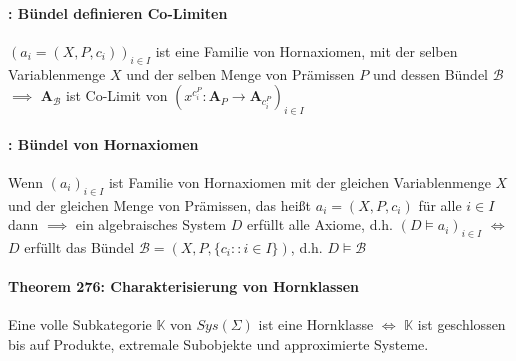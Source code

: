 \paragraph{: Bündel definieren Co-Limiten}
$\left(a_{i}=\left(X,P,c_{i}\right)\right)_{i\in I}$ ist eine Familie von Hornaxiomen, mit der selben Variablenmenge
$X$ und der selben Menge von Prämissen $P$ und dessen Bündel $\mathcal{B}$ \\ 
$\implies$  $\mathbf{A}_{\mathcal{B}}$
ist Co-Limit von $\left(x^{c_{i}^{P}}:\mathbf{A}_{P}\rightarrow\mathbf{A}_{c_{i}^{P}}\right)_{i\in I}$

\paragraph{: Bündel von Hornaxiomen}
Wenn $(a_i)_{i \in I}$ ist Familie von Hornaxiomen mit der gleichen Variablenmenge $X$ und der gleichen Menge von Prämissen, das heißt $a_i = (X, P, c_i)$ für alle $i \in I$ \\
dann $\implies$ ein algebraisches System $D$ erfüllt alle Axiome, d.h. $(D \models a_i)_{i \in I}$ $\Leftrightarrow$ $D$ erfüllt das Bündel $\mathcal{B} = (X, P, \{c_i:: i \in I\})$, d.h. $D \models \mathcal{B}$

\paragraph{Theorem 276: Charakterisierung von Hornklassen}
Eine volle Subkategorie $\mathbb{K}$ von $Sys(\Sigma)$ ist eine Hornklasse $\Leftrightarrow$ $\mathbb{K}$ ist geschlossen bis auf Produkte, extremale Subobjekte und approximierte Systeme.




